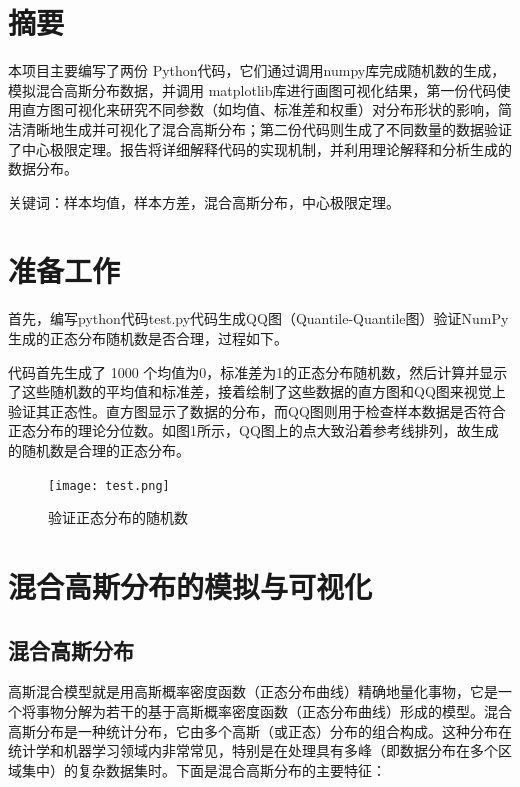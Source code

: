 \documentclass[a4paper]{article}
\title{\yihao{概率统计大作业}}
\begin{document}
\maketitle

\newpage

\tableofcontents
\newpage
\section*{摘要}


本项目主要编写了两份 Python代码，它们通过调用numpy库完成随机数的生成，模拟混合高斯分布数据，并调用 matplotlib库进行画图可视化结果，第一份代码使用直方图可视化来研究不同参数（如均值、标准差和权重）对分布形状的影响，简洁清晰地生成并可视化了混合高斯分布；第二份代码则生成了不同数量的数据验证了中心极限定理。报告将详细解释代码的实现机制，并利用理论解释和分析生成的数据分布。

关键词：样本均值，样本方差，混合高斯分布，中心极限定理。

\section{准备工作}
首先，编写python代码test.py代码生成QQ图（Quantile-Quantile图）验证NumPy生成的正态分布随机数是否合理，过程如下。

代码首先生成了 1000 个均值为0，标准差为1的正态分布随机数，然后计算并显示了这些随机数的平均值和标准差，接着绘制了这些数据的直方图和QQ图来视觉上验证其正态性。直方图显示了数据的分布，而QQ图则用于检查样本数据是否符合正态分布的理论分位数。如图1所示，QQ图上的点大致沿着参考线排列，故生成的随机数是合理的正态分布。
\begin{figure}[h]
  \centering
  \texttt{[image: test.png]}
  \caption{验证正态分布的随机数}
  \label{fig:my_label}
\end{figure}


\section{混合高斯分布的模拟与可视化}

\subsection{混合高斯分布}
高斯混合模型就是用高斯概率密度函数（正态分布曲线）精确地量化事物，它是一个将事物分解为若干的基于高斯概率密度函数（正态分布曲线）形成的模型。混合高斯分布是一种统计分布，它由多个高斯（或正态）分布的组合构成。这种分布在统计学和机器学习领域内非常常见，特别是在处理具有多峰（即数据分布在多个区域集中）的复杂数据集时。下面是混合高斯分布的主要特征：
\end{document}
